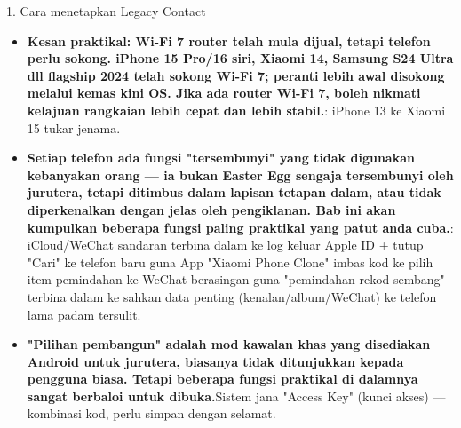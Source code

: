 \begin{tcbinfo}{1. Cara menetapkan Legacy Contact}
\begin{itemize}
  \item \textbf{Kesan praktikal: Wi-Fi 7 router telah mula dijual, tetapi telefon perlu sokong. iPhone 15 Pro/16 siri, Xiaomi 14, Samsung S24 Ultra dll flagship 2024 telah sokong Wi-Fi 7; peranti lebih awal disokong melalui kemas kini OS. Jika ada router Wi-Fi 7, boleh nikmati kelajuan rangkaian lebih cepat dan lebih stabil.}: iPhone 13 ke Xiaomi 15 tukar jenama.
  \item \textbf{Setiap telefon ada fungsi "tersembunyi" yang tidak digunakan kebanyakan orang — ia bukan Easter Egg sengaja tersembunyi oleh jurutera, tetapi ditimbus dalam lapisan tetapan dalam, atau tidak diperkenalkan dengan jelas oleh pengiklanan. Bab ini akan kumpulkan beberapa fungsi paling praktikal yang patut anda cuba.}: iCloud/WeChat sandaran terbina dalam ke log keluar Apple ID + tutup "Cari" ke telefon baru guna App "Xiaomi Phone Clone" imbas kod ke pilih item pemindahan ke WeChat berasingan guna "pemindahan rekod sembang" terbina dalam ke sahkan data penting (kenalan/album/WeChat) ke telefon lama padam tersulit.
  \item \textbf{"Pilihan pembangun" adalah mod kawalan khas yang disediakan Android untuk jurutera, biasanya tidak ditunjukkan kepada pengguna biasa. Tetapi beberapa fungsi praktikal di dalamnya sangat berbaloi untuk dibuka.}Sistem jana "Access Key" (kunci akses) — kombinasi kod, perlu simpan dengan selamat.
\end{itemize}

\end{tcbinfo}
